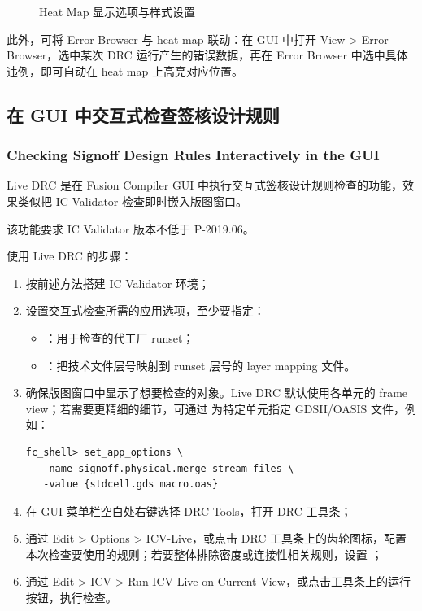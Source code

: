 \begin{figure}[htbp]
\centering
{}
\caption{Heat Map 显示选项与样式设置}
\label{fig:icv-heatmap-config}
\end{figure}

此外，可将 Error Browser 与 heat map 联动：在 GUI 中打开 View > Error Browser，选中某次 DRC 运行产生的错误数据，再在 Error Browser 中选中具体违例，即可自动在 heat map 上高亮对应位置。

\subsection{在 GUI 中交互式检查签核设计规则}
\subsubsection*{Checking Signoff Design Rules Interactively in the GUI}

Live DRC 是在 Fusion Compiler GUI 中执行交互式签核设计规则检查的功能，效果类似把 IC Validator 检查即时嵌入版图窗口。

\begin{noteBox}
该功能要求 IC Validator 版本不低于 P-2019.06。
\end{noteBox}

使用 Live DRC 的步骤：
\begin{enumerate}
  \item 按前述方法搭建 IC Validator 环境；
  \item 设置交互式检查所需的应用选项，至少要指定：
        \begin{itemize}
          \item {}：用于检查的代工厂 runset；
          \item {}：把技术文件层号映射到 runset 层号的 layer mapping 文件。
        \end{itemize}
  \item 确保版图窗口中显示了想要检查的对象。Live DRC 默认使用各单元的 frame view；若需要更精细的细节，可通过  为特定单元指定 GDSII/OASIS 文件，例如：
\begin{lstlisting}
fc_shell> set_app_options \
   -name signoff.physical.merge_stream_files \
   -value {stdcell.gds macro.oas}
\end{lstlisting}
  \item 在 GUI 菜单栏空白处右键选择 DRC Tools，打开 DRC 工具条；
  \item 通过 Edit > Options > ICV-Live，或点击 DRC 工具条上的齿轮图标，配置本次检查要使用的规则；若要整体排除密度或连接性相关规则，设置 ；
  \item 通过 Edit > ICV > Run ICV-Live on Current View，或点击工具条上的运行按钮，执行检查。
\end{enumerate}

